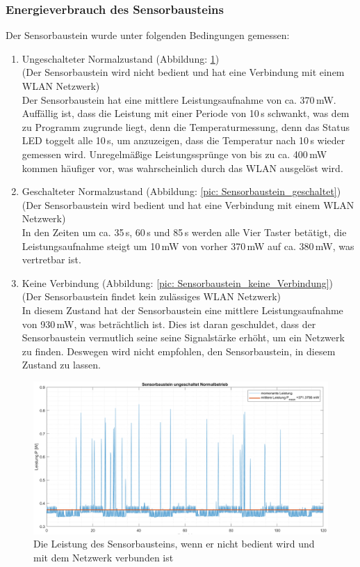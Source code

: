 \subsubsection{Energieverbrauch des Sensorbausteins} \label{energie_sensorbaustein}
Der Sensorbaustein wurde unter folgenden Bedingungen gemessen:
\begin{enumerate}
	\item Ungeschalteter Normalzustand (Abbildung: \ref{pic: Sensorbaustein_ungeschaltet}) \\(Der Sensorbaustein wird nicht bedient und hat eine Verbindung mit einem WLAN Netzwerk) \\
	Der Sensorbaustein hat eine mittlere Leistungsaufnahme von ca. 370\,mW. Auffällig ist, dass die Leistung mit einer Periode von 10\,s schwankt, was dem zu Programm zugrunde liegt, denn die Temperaturmessung, denn das Status LED toggelt alle 10\,s, um anzuzeigen, dass die Temperatur nach 10\,s wieder gemessen wird. Unregelmäßige Leistungssprünge von bis zu ca. 400\,mW kommen häufiger vor, was wahrscheinlich durch das WLAN ausgelöst wird.
	\\
	\item Geschalteter Normalzustand (Abbildung: \ref{pic: Sensorbaustein_geschaltet})\\ (Der Sensorbaustein wird bedient und hat eine Verbindung mit einem WLAN Netzwerk)\\
	In den Zeiten um ca. 35\,s, 60\,s und 85\,s werden alle Vier Taster betätigt, die Leistungsaufnahme steigt um 10\,mW von vorher 370\,mW auf ca. 380\,mW, was vertretbar ist.
	\\
	\item Keine Verbindung (Abbildung: \ref{pic: Sensorbaustein_keine_Verbindung})\\ (Der Sensorbaustein findet kein zulässiges WLAN Netzwerk)\\
	In diesem Zustand hat der Sensorbaustein eine mittlere Leistungsaufnahme von 930\,mW, was beträchtlich ist. Dies ist daran geschuldet, dass der Sensorbaustein vermutlich seine seine Signalstärke erhöht, um ein Netzwerk zu finden. Deswegen wird nicht empfohlen, den Sensorbaustein, in diesem Zustand zu lassen.
\end{enumerate}


\begin{figure}[H]
	\centering
	\includegraphics[width=1\textwidth]{graphics/Sensorbaustein_ungeschaltet.png}
	\caption{Die Leistung des Sensorbausteins, wenn er nicht bedient wird und mit dem Netzwerk verbunden ist}
	\label{pic: Sensorbaustein_ungeschaltet}
\end{figure}

